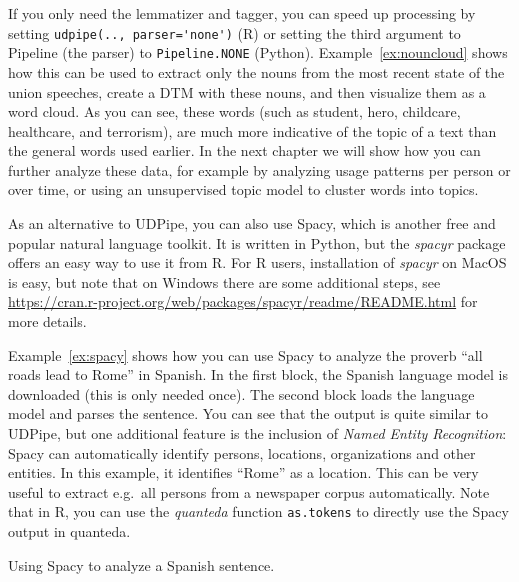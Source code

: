 If you only need the lemmatizer and tagger, you can speed up processing by setting \verb|udpipe(.., parser='none')| (R) or setting the third argument to Pipeline (the parser) to \verb|Pipeline.NONE| (Python).
Example~\ref{ex:nouncloud} shows how this can be used to extract only the nouns from the most recent state of the union speeches,
create a DTM with these nouns, and then visualize them as a word cloud.
As you can see, these words (such as student, hero, childcare, healthcare, and terrorism), are much more indicative of the topic of a text than the general words used earlier.
In the next chapter we will show how you can further analyze these data, for example by analyzing usage patterns per person or over time, or using an unsupervised topic model to cluster words into topics.


As an alternative to UDPipe, you can also use Spacy,
which is another free and popular natural language toolkit.
It is written in Python, but the \emph{spacyr} package offers an easy way to use it from R.
For R users, installation of \emph{spacyr} on MacOS is easy,
but note that on Windows there are some additional steps, see
\url{https://cran.r-project.org/web/packages/spacyr/readme/README.html} for more details.

Example~\ref{ex:spacy} shows how you can use Spacy to analyze the proverb ``all roads lead to Rome'' in Spanish.
In the first block, the Spanish language model is downloaded (this is only needed once).
The second block loads the language model and parses the sentence.
You can see that the output is quite similar to UDPipe, but one additional feature is the inclusion of
\emph{Named Entity Recognition}:
Spacy can automatically identify persons, locations, organizations and other entities.
In this example, it identifies ``Rome'' as a location.
This can be very useful to extract e.g.\ all persons from a newspaper corpus automatically.
Note that in R, you can use the \emph{quanteda} function \texttt{as.tokens} to directly use the Spacy output in quanteda.

\begin{ccsexample}
  \caption{Using Spacy to analyze a Spanish sentence.}\label{ex:spacy}
\end{ccsexample}

